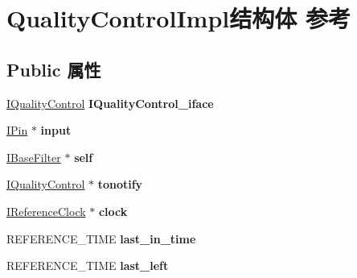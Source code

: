 \hypertarget{struct_quality_control_impl}{}\section{Quality\+Control\+Impl结构体 参考}
\label{struct_quality_control_impl}
\subsection*{Public 属性}
\begin{DoxyCompactItemize}
\item 
\mbox{\label{struct_quality_control_impl_a7498e2825f2894698fb5467117375ab9}} 
\hyperlink{interface_i_quality_control}{I\+Quality\+Control} {\bfseries I\+Quality\+Control\+\_\+iface}
\item 
\mbox{\label{struct_quality_control_impl_a65043fcd9c9357796b0ff9cd4e403855}} 
\hyperlink{interface_i_pin}{I\+Pin} $\ast$ {\bfseries input}
\item 
\mbox{\label{struct_quality_control_impl_a7379eb3f310b01936ed5f21e8f863ab7}} 
\hyperlink{interface_i_base_filter}{I\+Base\+Filter} $\ast$ {\bfseries self}
\item 
\mbox{\label{struct_quality_control_impl_aba5c00fbfb98c18ce052b6ec50398db7}} 
\hyperlink{interface_i_quality_control}{I\+Quality\+Control} $\ast$ {\bfseries tonotify}
\item 
\mbox{\label{struct_quality_control_impl_a8b323ff0f02e8b7d5640bf6a790652b8}} 
\hyperlink{interface_i_reference_clock}{I\+Reference\+Clock} $\ast$ {\bfseries clock}
\item 
\mbox{\label{struct_quality_control_impl_a58132b0f2191ba573584cbf0ccb1fcd8}} 
R\+E\+F\+E\+R\+E\+N\+C\+E\+\_\+\+T\+I\+ME {\bfseries last\+\_\+in\+\_\+time}
\item 
\mbox{\label{struct_quality_control_impl_ad3f8c13d9f0a26f96bed950d37f2b019}} 
R\+E\+F\+E\+R\+E\+N\+C\+E\+\_\+\+T\+I\+ME {\bfseries last\+\_\+left}
\item 

\end{DoxyCompactItemize}
